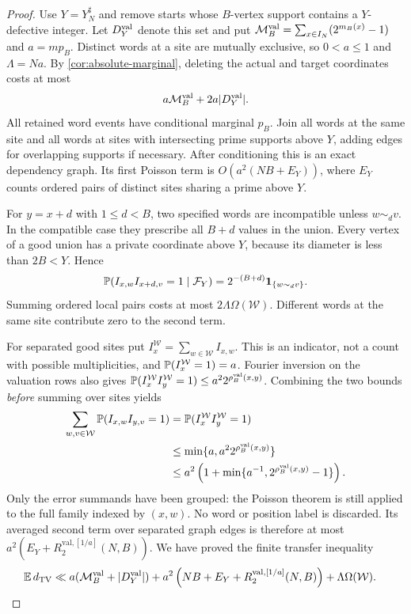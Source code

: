\begin{proof}
Use $Y=Y_N^\sharp$ and remove starts whose $B$-vertex support contains a
$Y$-defective integer. Let $D_Y^{\rm val}$ denote this set and put
$\mathcal M_B^{\rm val}=\sum_{x\in I_N}(2^{m_B(x)}-1)$ and $a=mp_B$.
Distinct words at a site are mutually exclusive, so $0<a\le1$ and
$\Lambda=Na$. By \cref{cor:absolute-marginal}, deleting the actual and
target coordinates costs at most
\[
 a\mathcal M_B^{\rm val}+2a|D_Y^{\rm val}|.
\]
All retained word events have conditional marginal $p_B$. Join all words
at the same site and all words at sites with intersecting prime supports
above $Y$, adding edges for overlapping supports if necessary. After
conditioning this is an exact dependency graph. Its first Poisson term is
$O(a^2(NB+E_Y))$, where $E_Y$ counts ordered pairs of distinct sites
sharing a prime above $Y$.

For $y=x+d$ with $1\le d<B$, two specified words are incompatible unless
$w\sim_d v$. In the compatible case they prescribe all $B+d$ values in
the union. Every vertex of a good union has a private coordinate above
$Y$, because its diameter is less than $2B<Y$. Hence
\begin{equation}\label{eq:absolute-overlap-law}
 \mathbb P(I_{x,w}I_{x+d,v}=1\mid\mathcal F_Y)
          =2^{-(B+d)}\mathbf 1_{\{w\sim_d v\}}.
\end{equation}
Summing ordered local pairs costs at most $2\Lambda\Omega(\mathcal W)$.
Different words at the same site contribute zero to the second term.

For separated good sites put $I_x^{\mathcal W}=\sum_{w\in\mathcal W}I_{x,w}$.
This is an indicator, not a count with possible multiplicities, and
$\mathbb P(I_x^{\mathcal W}=1)=a$. Fourier inversion on the valuation rows also gives
$\mathbb P(I_x^{\mathcal W}I_y^{\mathcal W}=1)\le a^2 2^{\rho_B^{\rm val}(x,y)}$. Combining the two
bounds \emph{before} summing over sites yields
\begin{align}
 \sum_{w,v\in\mathcal W}\mathbb P(I_{x,w}I_{y,v}=1)
 &=\mathbb P(I_x^{\mathcal W}I_y^{\mathcal W}=1)\notag\\
 &\le \min\{a,a^2 2^{\rho_B^{\rm val}(x,y)}\}\notag\\
 &\le a^2\left(1+
       \min\{a^{-1},2^{\rho_B^{\rm val}(x,y)}-1\}\right).
       \label{eq:dictionary-saturation}
\end{align}
Only the error summands have been grouped: the Poisson theorem is still
applied to the full family indexed by $(x,w)$. No word or position
label is discarded. Its averaged second term over separated graph
edges is therefore at most
$a^2(E_Y+R_2^{\mathrm{val},[1/a]}(N,B))$. We have proved the finite
transfer inequality
\begin{align}
 \mathbb E\,d_{\mathrm{TV}}
 &\ll a(\mathcal M_B^{\rm val}+|D_Y^{\rm val}|)
       +a^2\left(NB+E_Y+R_2^{\mathrm{val},[1/a]}(N,B)\right)
       +\Lambda\Omega(\mathcal W).
       \label{eq:dictionary-finite-transfer}
\end{align}


\end{proof}
